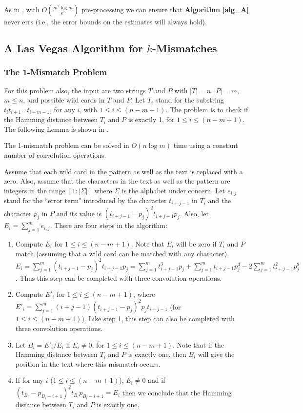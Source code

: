  As in \cite{KAR93}, with $O\left (\frac{m^2\log
m}{\epsilon^2}\right )$ pre-processing we can ensure that {\bf Algorithm
\ref{alg_A}} never errs (i.e., the error bounds on the estimates will always
hold).
 
\subsection{A Las Vegas Algorithm for $k$-Mismatches}

\subsubsection{The 1-Mismatch Problem}
\label{sec_one_mismatch}
 For this problem also, the input are two
strings $T$ and $P$ with $|T|=n,|P|=m,$ $m\leq n$, and
possible wild cards in $T$ and $P$. Let $T_i$ stand for the substring $t_{i}t_{i+1}\ldots t_{i+m-1}$, for any $i$, with $1\leq i\leq
(n-m+1)$. The problem is to check if the Hamming distance between $T_i$ and $P$
is exactly 1, for $1\leq i\leq (n-m+1)$. The following Lemma is shown in
\cite{CEP+07}.

\begin{lemma}\label{1mm}
The 1-mismatch problem can be solved in $O(n\log m)$ time using a constant
number of convolution operations.
\end{lemma}
 
 
  Assume that each wild card in the pattern as
 well as the text is replaced with a zero. Also, assume that the characters in
 the text as well as the pattern are integers in the range $[1:|\Sigma|]$ where
 $\Sigma$ is the alphabet under concern. Let $e_{i,j}$ stand for the ``error
 term" introduced by the character $t_{i+j-1}$ in $T_i$ and the character $p_j$
 in $P$ and its value is $(t_{i+j-1}-p_j)^2t_{i+j-1}p_j$. Also, let
 $E_i=\sum_{j=1}^me_{i,j}$. There are four steps in the algorithm:
 \begin{enumerate}
 \item Compute $E_i$ for $1\leq i\leq(n-m+1)$. Note that $E_i$ will be zero if
 $T_i$ and $P$ match (assuming that a wild card can be matched with any character).
$E_i=\sum_{j=1}^m(t_{i+j-1}-p_j)^2t_{i+j-1}p_j=\sum_{j=1}^mt_{i+j-1}^3p_j+\sum_{j=1}^mt_{i+j-1}p_j^3-2\sum_{j=1}^mt_{i+j-1}^2p_j^2$. Thus this step can be completed with three convolution operations.
 \item Compute $E'_i$ for $1\leq i\leq (n-m+1)$, where
 $E'_i=\sum_{j=1}^m(i+j-1)(t_{i+j-1}-p_j)^2p_jt_{i+j-1}$ (for $1\leq
 i\leq(n-m+1))$. Like step 1, this step can also be completed with three
 convolution operations.
 \item Let $B_i=E'_i/E_i$ if $E_i\neq 0$, for $1\leq i\leq (n-m+1)$. Note that
 if the Hamming distance between $T_i$ and $P$ is exactly one, then $B_i$ will
 give the position in the text where this mismatch occurs.
 \item If for any $i$ ($1\leq i\leq (n-m+1)$), $E_i\neq 0$ and if
 $(t_{B_i}-p_{B_i-i+1})^2t_{B_i}p_{B_i-i+1}=E_i$ then we conclude that the
 Hamming distance between $T_i$ and $P$ is exactly one.
 \end{enumerate}
 
